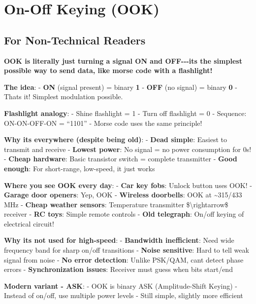 \section{On-Off Keying (OOK)}\label{on-off-keying-ook}

\subsection{\texorpdfstring{ For Non-Technical
Readers}{ For Non-Technical Readers}}\label{for-non-technical-readers}

\textbf{OOK is literally just turning a signal ON and
OFF-\/-\/-it\textquotesingle s the simplest possible way to send data,
like morse code with a flashlight!}

\textbf{The idea}: - \textbf{ON} (signal present) = binary \textbf{1} -
\textbf{OFF} (no signal) = binary \textbf{0} - That\textquotesingle s
it! Simplest modulation possible.

\textbf{Flashlight analogy}: - Shine flashlight = 1 - Turn off
flashlight = 0 - Sequence: ON-ON-OFF-ON = ``1101'' - Morse code uses the
same principle!

\textbf{Why it\textquotesingle s everywhere (despite being old)}: -
\textbf{Dead simple}: Easiest to transmit and receive - \textbf{Lowest
power}: No signal = no power consumption for 0s! - \textbf{Cheap
hardware}: Basic transistor switch = complete transmitter - \textbf{Good
enough}: For short-range, low-speed, it just works

\textbf{Where you see OOK every day}: - \textbf{Car key fobs}: Unlock
button uses OOK! - \textbf{Garage door openers}: Yep, OOK -
\textbf{Wireless doorbells}: OOK at \textasciitilde315/433 MHz -
\textbf{Cheap weather sensors}: Temperature transmitter
\$\textbackslash rightarrow\$ receiver - \textbf{RC toys}: Simple remote
controls - \textbf{Old telegraph}: On/off keying of electrical circuit!

\textbf{Why it\textquotesingle s not used for high-speed}: -
\textbf{Bandwidth inefficient}: Need wide frequency band for sharp
on/off transitions - \textbf{Noise sensitive}: Hard to tell weak signal
from noise - \textbf{No error detection}: Unlike PSK/QAM,
can\textquotesingle t detect phase errors - \textbf{Synchronization
issues}: Receiver must guess when bits start/end

\textbf{Modern variant - ASK}: - OOK is binary ASK (Amplitude-Shift
Keying) - Instead of on/off, use multiple power levels - Still simple,
slightly more efficient

